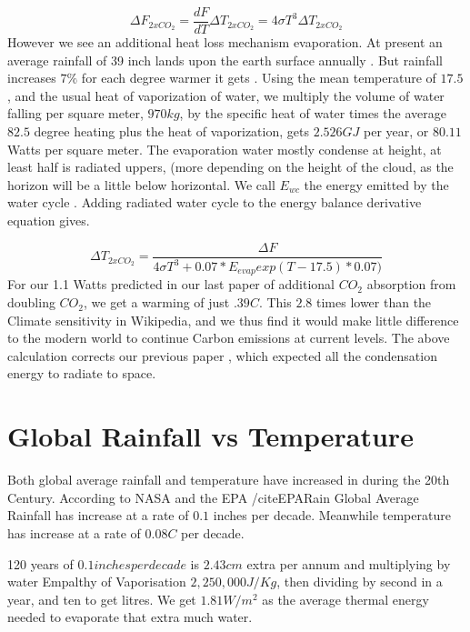 \documentclass{book}
\begin{document}
	\begin{equation}
		\Delta F_{2xCO_2} = \frac{dF}{dT} \Delta T_{2xCO_2}  = 4\sigma T^3 \Delta T_{2xCO_2} 
	\end{equation}
	However we see an additional heat loss mechanism evaporation. At present an average rainfall of 39 inch lands upon the earth surface annually \cite{rainfall}. But rainfall increases $7\%$ for each degree warmer it gets \cite{rainrise}.
	Using the mean temperature of $17.5$, and the usual heat of vaporization of water, we multiply the volume of water falling per square meter, $970kg$, by the specific heat of water times the average $82.5$ degree heating plus the heat of vaporization, gets $2.526GJ$ per year, or $80.11$ Watts per square meter. The evaporation water mostly condense at height, at least half is radiated uppers, (more depending on the height of the cloud, as the horizon will be a little below horizontal. We call $E_{wc}$ the energy emitted by the water cycle . Adding radiated water cycle to the energy balance derivative equation gives.	
	
	
	\begin{equation}
		\Delta T_{2xCO_2} = \frac{ \Delta F}{ 4\sigma T^3 + 0.07 * E_{evap} exp( T-17.5)*0.07)}
	\end{equation}
	For our 1.1 Watts predicted in our last paper \cite{Adam1} of additional $CO_2$ absorption from doubling $CO_2$, we get a warming of just $.39 C$. This $2.8$ times lower than the \cite{wikisense} Climate sensitivity in Wikipedia, and we thus find it would make little difference to the modern world to continue Carbon emissions at current levels. The above calculation corrects our previous paper \cite{Adams1}, which expected all the condensation energy to radiate to space.
	
	\section{Global Rainfall vs Temperature}
	
	Both global average rainfall and temperature have increased in during the 20th Century. According to NASA and the EPA /cite{EPARain} Global Average Rainfall has increase at a rate of $0.1$ inches per decade.
	Meanwhile temperature has increase at a rate of $0.08 C$ per decade.
	
   120 years of $0.1 inches per decade$ is $2.43 cm$ extra per annum and multiplying by water Empalthy of Vaporisation $2,250,000 J/Kg$, then dividing by second in a year, and ten to get litres. We get $1.81 W/m^2$ as the
   average thermal energy needed to evaporate that extra much water.
   
\end{document}
